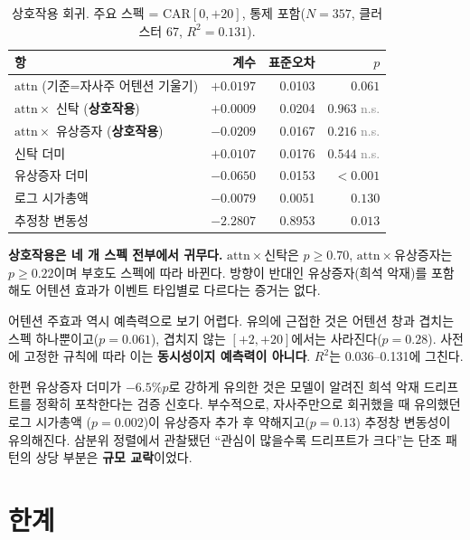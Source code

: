 \documentclass[11pt,a4paper]{article}
\newcommand{\sig}[1]{\textbf{#1}}
\newcommand{\ns}{\textcolor{gray}{n.s.}}
\begin{document}
\begin{table}[htbp]
\centering
\caption{상호작용 회귀. 주요 스펙 = $\mathrm{CAR}[0,+20]$, 통제 포함($N=357$, 클러스터 67, $R^2=0.131$).}
\small
\begin{tabular}{lrrr}
\toprule
항 & 계수 & 표준오차 & $p$ \\
\midrule
$\mathrm{attn}$ (기준=자사주 어텐션 기울기) & $+0.0197$ & 0.0103 & $0.061$ \\
$\mathrm{attn} \times$ 신탁 \quad(\textbf{상호작용}) & $+0.0009$ & 0.0204 & $0.963$ \ns \\
$\mathrm{attn} \times$ 유상증자 \quad(\textbf{상호작용}) & $-0.0209$ & 0.0167 & $0.216$ \ns \\
신탁 더미 & $+0.0107$ & 0.0176 & $0.544$ \ns \\
유상증자 더미 & $-0.0650$ & 0.0153 & \sig{$<0.001$} \\
로그 시가총액 & $-0.0079$ & 0.0051 & $0.130$ \\
추정창 변동성 & $-2.2807$ & 0.8953 & \sig{$0.013$} \\
\bottomrule
\end{tabular}
\end{table}

\sig{상호작용은 네 개 스펙 전부에서 귀무다.} $\mathrm{attn}\times$신탁은 $p \ge 0.70$,
$\mathrm{attn}\times$유상증자는 $p \ge 0.22$이며 부호도 스펙에 따라 바뀐다. 방향이 반대인
유상증자(희석 악재)를 포함해도 어텐션 효과가 이벤트 타입별로 다르다는 증거는 없다.

어텐션 주효과 역시 예측력으로 보기 어렵다. 유의에 근접한 것은 어텐션 창과 겹치는 스펙
하나뿐이고($p=0.061$), 겹치지 않는 $[+2,+20]$에서는 사라진다($p=0.28$). 사전에 고정한 규칙에
따라 이는 \sig{동시성이지 예측력이 아니다}. $R^2$는 0.036--0.131에 그친다.

한편 유상증자 더미가 $-6.5\%p$로 강하게 유의한 것은 모델이 알려진 희석 악재 드리프트를
정확히 포착한다는 검증 신호다. 부수적으로, 자사주만으로 회귀했을 때 유의했던 로그 시가총액
($p=0.002$)이 유상증자 추가 후 약해지고($p=0.13$) 추정창 변동성이 유의해진다. 삼분위 정렬에서
관찰됐던 ``관심이 많을수록 드리프트가 크다''는 단조 패턴의 상당 부분은 \sig{규모 교락}이었다.

\section{한계}
\end{document}
